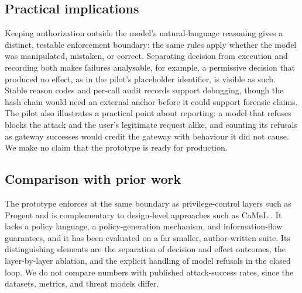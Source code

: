 \documentclass[3p,twocolumn]{elsarticle}
\begin{document}
\subsection{Practical implications}
Keeping authorization outside the model's natural-language reasoning gives a distinct, testable enforcement boundary: the same rules apply whether the model was manipulated, mistaken, or correct. Separating decision from execution and recording both makes failures analysable, for example, a permissive decision that produced no effect, as in the pilot's placeholder identifier, is visible as such. Stable reason codes and per-call audit records support debugging, though the hash chain would need an external anchor before it could support forensic claims. The pilot also illustrates a practical point about reporting: a model that refuses blocks the attack and the user's legitimate request alike, and counting its refusals as gateway successes would credit the gateway with behaviour it did not cause. We make no claim that the prototype is ready for production.

\subsection{Comparison with prior work}
The prototype enforces at the same boundary as privilege-control layers such as Progent \cite{progent2025} and is complementary to design-level approaches such as CaMeL \cite{camel2025}. It lacks a policy language, a policy-generation mechanism, and information-flow guarantees, and it has been evaluated on a far smaller, author-written suite. Its distinguishing elements are the separation of decision and effect outcomes, the layer-by-layer ablation, and the explicit handling of model refusals in the closed loop. We do not compare numbers with published attack-success rates, since the datasets, metrics, and threat models differ.

\end{document}
